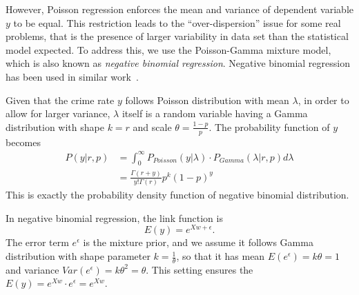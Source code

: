 However, Poisson regression enforces the mean and variance of dependent variable $y$ to be equal. This restriction leads to the ``over-dispersion'' issue for some real problems, that is the presence of larger variability in data set than the statistical model expected. To address this,  we use the Poisson-Gamma mixture model, which is also known as \emph{negative binomial regression}.  Negative binomial regression has been used in similar work~\cite{Osg00}.




Given that the crime rate $y$ follows Poisson distribution with mean $\lambda$, in order to allow for larger variance, $\lambda$ itself is a random variable having a Gamma distribution with shape $k=r$ and scale $\theta = \frac{1-p}{p}$.  The probability function of $y$ becomes
\begin{align}
P(y| r, p) & = \int_0^{\infty} P_{Poisson}(y|\lambda) \cdot P_{Gamma}(\lambda|r, p) d \lambda \nonumber \\ 
		& = \frac{\Gamma(r+y)}{y! \Gamma(r)} p^k (1-p)^y
\end{align}
This is exactly the probability density function of negative binomial distribution.


In negative binomial regression, the link function is
\begin{equation}
E(y) = e^{X w + \epsilon}.
\end{equation}
The error term $e^\epsilon$ is the mixture prior, and we assume it follows Gamma distribution with shape parameter $k=\frac{1}{\theta}$, so that it has mean $E(e^\epsilon) = k\theta = 1$ and variance $Var(e^\epsilon) = k\theta^2 = \theta$. This setting ensures the $E(y) = e^{Xw} \cdot e^\epsilon = e^{Xw}$.

